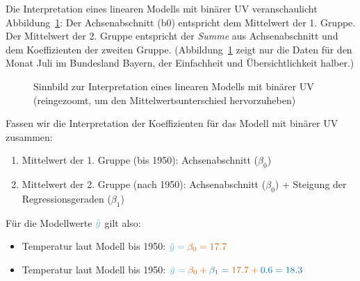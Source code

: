 \documentclass[
  letterpaper,
]{scrbook}
\providecommand{\tightlist}{%
  \setlength{\itemsep}{0pt}\setlength{\parskip}{0pt}}\usepackage{longtable,booktabs,array}
\theoremstyle{definition}
\theoremstyle{definition}
\theoremstyle{definition}
\theoremstyle{remark}
\begin{document}
Die Interpretation eines linearen Modells mit binärer UV veranschaulicht
Abbildung~\ref{fig-binvar}: Der Achsenabschnitt (b0) entspricht dem
Mittelwert der 1. Gruppe. Der Mittelwert der 2. Gruppe entspricht der
\emph{Summe} aus Achsenabschnitt und dem Koeffizienten der zweiten
Gruppe. (Abbildung~\ref{fig-binvar} zeigt nur die Daten für den Monat
Juli im Bundesland Bayern, der Einfachheit und Übersichtlichkeit
halber.)

\begin{figure}


\caption{\label{fig-binvar}Sinnbild zur Interpretation eines linearen
Modells mit binärer UV (reingezoomt, um den Mittelwertsunterschied
hervorzuheben)}

\end{figure}%

Fassen wir die Interpretation der Koeffizienten für das Modell mit
binärer UV zusammen:

\begin{enumerate}
\def\labelenumi{\arabic{enumi}.}
\tightlist
\item
  Mittelwert der 1. Gruppe (bis 1950): {Achsenabschnitt (\(\beta_0\))}
\item
  Mittelwert der 2. Gruppe (nach 1950): {Achsenabschnitt (\(\beta_0\))}
  + {Steigung der Regressionsgeraden (\(\beta_1\))}
\end{enumerate}

Für die Modellwerte \(\color{modelcol}{\hat{y}}\) gilt also:

\begin{itemize}
\item
  Temperatur laut Modell bis 1950:
  \(\color{modelcol}{\hat{y}} = \color{beta0col}{\beta_0} = 17.7\)
\item
  Temperatur laut Modell bis 1950:
  \(\color{modelcol}{\hat{y}} = \color{beta0col}{\beta_0} +  \color{beta1col}{\beta_1}= \color{beta0col}{17.7} + \color{beta1col}{0.6} = 18.3\)
\end{itemize}
\end{document}
